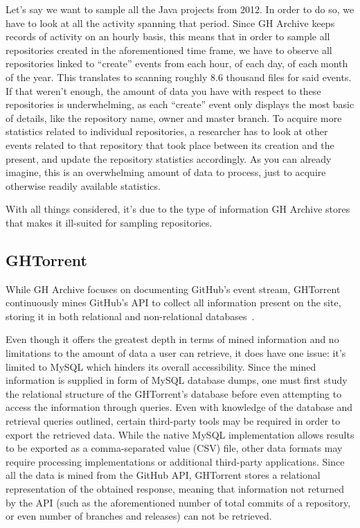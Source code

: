 Let's say we want to sample all the Java projects from 2012.
In order to do so, we have to look at all the activity spanning that period.
Since GH Archive keeps records of activity on an hourly basis, this means that in order to sample all repositories created in the aforementioned time frame, we have to observe all repositories linked to ``create'' events from each hour, of each day, of each month of the year.
This translates to scanning roughly 8.6 thousand files for said events.
If that weren't enough, the amount of data you have with respect to these repositories is underwhelming, as each ``create'' event only displays the most basic of details, like the repository name, owner and master branch.
To acquire more statistics related to individual repositories, a researcher has to look at other events related to that repository that took place between its creation and the present, and update the repository statistics accordingly.
As you can already imagine, this is an overwhelming amount of data to process, just to acquire otherwise readily available statistics.

With all things considered, it's due to the type of information GH Archive stores that makes it ill-suited for sampling repositories.

\subsection{GHTorrent}

While GH Archive focuses on documenting GitHub's event stream, GHTorrent continuously mines GitHub's API to collect all information present on the site, storing it in both relational and non-relational databases~\cite{G13}.

Even though it offers the greatest depth in terms of mined information and no limitations to the amount of data a user can retrieve, it does have one issue: it's limited to MySQL which hinders its overall accessibility.
Since the mined information is supplied in form of MySQL database dumps, one must first study the relational structure of the GHTorrent's database before even attempting to access the information through queries.
Even with knowledge of the database and retrieval queries outlined, certain third-party tools may be required in order to export the retrieved data.
While the native MySQL implementation allows results to be exported as a comma-separated value (CSV) file, other data formats may require processing implementations or additional third-party applications.
Since all the data is mined from the GitHub API, GHTorrent stores a relational representation of the obtained response, meaning that information not returned by the API (such as the aforementioned number of total commits of a repository, or even number of branches and releases) can not be retrieved.
